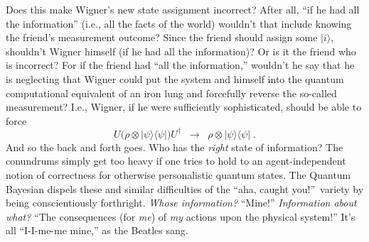 Does this make Wigner's new state assignment incorrect?  After all, ``if he had all the information'' (i.e., all the facts of the world) wouldn't that include knowing the friend's measurement outcome? Since the friend should assign some $|i\rangle$, shouldn't Wigner himself (if he had all the information)?  Or is it the friend who is incorrect?  For if the friend had ``all the information,'' wouldn't he say that he is neglecting that Wigner could put the system and himself into the quantum computational equivalent of an iron lung and forcefully reverse the so-called measurement?  I.e., Wigner, if he were sufficiently sophisticated, should be able to force
\begin{equation}
U\big(\rho\otimes|\psi\rangle\langle\psi|\big)U^\dagger\;\;\longrightarrow\;\;\rho\otimes|\psi\rangle\langle\psi|\;.
\label{RatifiedLatified}
\end{equation}
And so the back and forth goes.  Who has the {\it right\/} state of information?  The conundrums simply get too heavy if one tries to hold to an agent-independent notion of correctness for otherwise personalistic quantum states.  The Quantum Bayesian dispels these and similar difficulties of the ``aha, caught you!''~variety by being conscientiously forthright.  {\it Whose information?\/}  ``Mine!''  {\it Information about what?\/}  ``The consequences (for {\it me\/}) of {\it my\/} actions upon the physical system!''  It's all ``I-I-me-me mine,'' as the Beatles sang.

